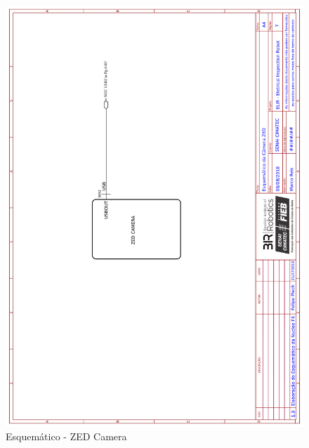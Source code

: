 	
    \begin{figure}[h]
	\centering
	\includegraphics[width=14cm]{Figures/EsquematicoZED.png}
	\caption{Esquemático - ZED Camera} \label{ZED}
	\end{figure}
	
	\pagebreak


